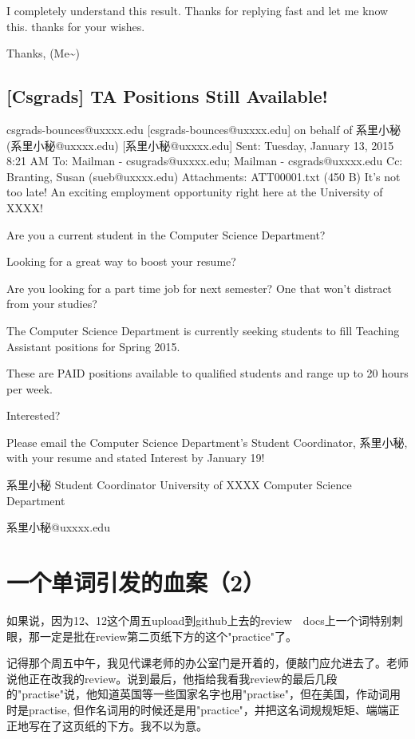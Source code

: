\documentclass[12pt]{book}
\begin{document}
I completely understand this result. Thanks for replying fast and let me know this. thanks for your wishes. 

Thanks,
(Me\textasciitilde{})

\subsection{[Csgrads] TA Positions Still Available!}
\label{sec-36-1-5}
csgrads-bounces@uxxxx.edu [csgrads-bounces@uxxxx.edu] on behalf of 系里小秘 (系里小秘@uxxxx.edu) [系里小秘@uxxxx.edu]
Sent:        Tuesday, January 13, 2015 8:21 AM
To:        
Mailman - csugrads@uxxxx.edu; Mailman - csgrads@uxxxx.edu
Cc:        
Branting, Susan (sueb@uxxxx.edu)
Attachments:        
ATT00001.txt‎ (450 B‎)
It’s not too late! An exciting employment opportunity right here at the University of XXXX!

Are you a current student in the Computer Science Department? 

Looking for a great way to boost your resume?

Are you looking for a part time job for next semester? One that won't distract from your studies? 

The Computer Science Department is currently seeking students to fill Teaching Assistant positions for Spring 2015. 

These are PAID positions available to qualified students and range up to 20 hours per week. 

Interested? 

Please email the Computer Science Department's Student Coordinator, 系里小秘, with your resume and stated Interest by January 19!

系里小秘
Student Coordinator
University of XXXX
Computer Science Department

系里小秘@uxxxx.edu
\section{一个单词引发的血案（2）}
\label{sec-36-2}
如果说，因为12、12这个周五upload到github上去的review　docs上一个词特别刺眼，那一定是批在review第二页纸下方的这个"practice"了。

记得那个周五中午，我见代课老师的办公室门是开着的，便敲门应允进去了。老师说他正在改我的review。说到最后，他指给我看我review的最后几段的"practise"说，他知道英国等一些国家名字也用"practise"，但在美国，作动词用时是practise, 但作名词用的时候还是用"practice"，并把这名词规规矩矩、端端正正地写在了这页纸的下方。我不以为意。
\end{document}
